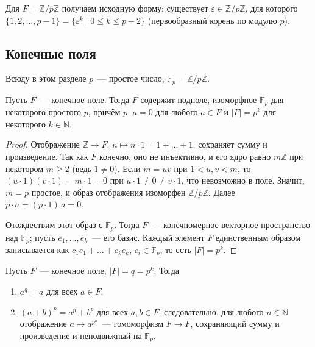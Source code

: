 \documentclass[12pt]{article}
\begin{document}
	\begin{note}
		Для $F = \mathbb{Z}/p\mathbb{Z}$ получаем исходную форму: существует $\varepsilon \in \mathbb{Z}/p\mathbb{Z}$, для которого $\{ 1, 2, \dots, p-1 \} = \{ \varepsilon^k \mid 0 \leqslant k \leqslant p - 2 \}$ (первообразный корень по модулю $p$).
	\end{note}

	\subsection{Конечные поля}

	Всюду в этом разделе $p$~--- простое число, $\mathbb{F}_p = \mathbb{Z}/p\mathbb{Z}$.

	\begin{theorem}\label{thm:fin-size}
		Пусть $F$~--- конечное поле. Тогда $F$ содержит подполе, изоморфное $\mathbb{F}_p$ для некоторого простого $p$, причём $p \cdot a = 0$ для любого $a \in F$ и $|F| = p^k$ для некоторого $k \in \mathbb{N}$.
	\end{theorem}

	\begin{proof}
		Отображение $\mathbb{Z} \to F$, $n \mapsto n \cdot 1 = 1 + \dots + 1$, сохраняет сумму и произведение. Так как $F$ конечно, оно не инъективно, и его ядро равно $m\mathbb{Z}$ при некотором $m \geqslant 2$ (ведь $1 \ne 0$). Если $m = uv$ при $1 < u, v < m$, то $(u \cdot 1)(v \cdot 1) = m \cdot 1 = 0$ при $u \cdot 1 \ne 0 \ne v \cdot 1$, что невозможно в поле. Значит, $m = p$ простое, и образ отображения изоморфен $\mathbb{Z}/p\mathbb{Z}$. Далее $p \cdot a = (p \cdot 1)\,a = 0$.

		Отождествим этот образ с $\mathbb{F}_p$. Тогда $F$~--- конечномерное векторное пространство над $\mathbb{F}_p$; пусть $e_1, \dots, e_k$~--- его базис. Каждый элемент $F$ единственным образом записывается как $c_1e_1 + \dots + c_ke_k$, $c_i \in \mathbb{F}_p$, то есть $|F| = p^k$.
	\end{proof}

	\begin{lemma}\label{lem:frobenius}
		Пусть $F$~--- конечное поле, $|F| = q = p^k$. Тогда
		\begin{enumerate}
			\item $a^q = a$ для всех $a \in F$;
			\item $(a + b)^p = a^p + b^p$ для всех $a, b \in F$; следовательно, для любого $n \in \mathbb{N}$ отображение $a \mapsto a^{p^n}$~--- гомоморфизм $F \to F$, сохраняющий сумму и произведение и неподвижный на $\mathbb{F}_p$.
		\end{enumerate}
	\end{lemma}
\end{document}
